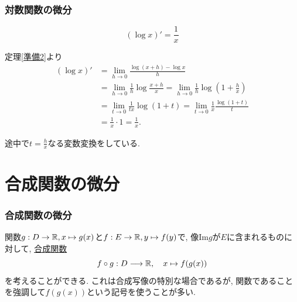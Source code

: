 

\begin{frame}
\frametitle{対数関数の微分}


\begin{Thm} 
$$(\log x)'=\frac{1}{x}$$
\end{Thm}

定理\ref{準備2}より \vspace{-2mm}
\begin{align*} 
(\log x)' &= \lim_{h\to0}\frac{\log(x+h)-\log x}{h} \\
&= \lim_{h\to0}\frac{1}{h} \log \frac{x+h}{x} = \lim_{h\to0}\frac{1}{h} \log (1+\frac{h}{x}) \\
&= \lim_{t\to0}\frac{1}{tx} \log (1+t) = \lim_{t\to0}\frac{1}{x} \frac{\log (1+t)}{t} \\
&=\frac{1}{x}\cdot 1=\frac{1}{x}. 
\end{align*}

途中で$t=\frac{h}{x}$なる変数変換をしている. 

\end{frame}




\section{合成関数の微分}

\begin{frame}
\frametitle{合成関数の微分}

関数$g:D \rightarrow \mathbb{R}, x\mapsto g(x)$と$f:E\rightarrow \mathbb{R}, y\mapsto f(y)$で, 像$\mathrm{Im}g$が$E$に含まれるものに対して, 
\underline{合成関数}
$$
f\circ g:D \longrightarrow \mathbb{R}, \ \ \ x \mapsto f(g(x))
$$
を考えることができる. 
これは合成写像の特別な場合であるが, 関数であることを強調して$f(g(x))$という記号を使うことが多い. 


\end{frame}




